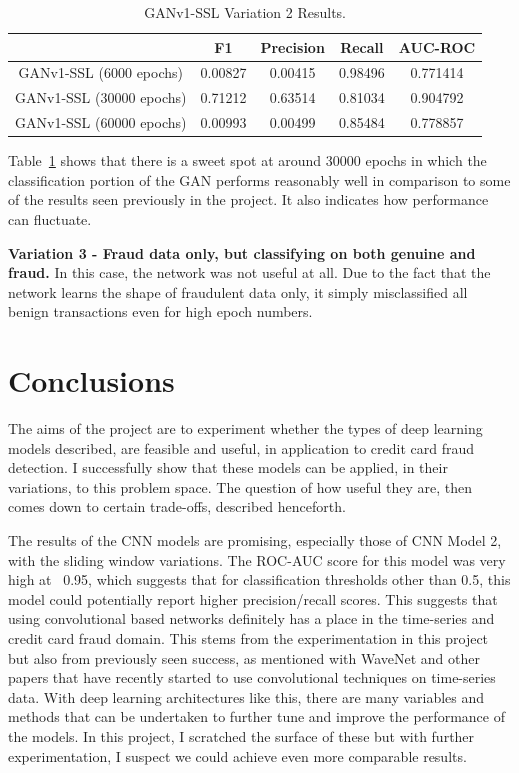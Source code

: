 \documentclass[12pt,a4paper,twoside]{report}
\begin{document}
\begin{table}[H]  
  \centering
  \begin{tabular}{ccccc}
    \toprule
           		& F1 & Precision & Recall & AUC-ROC \\ \midrule
    GANv1-SSL (6000 epochs) & 0.00827  &  0.00415 & 0.98496  & 0.771414 \\
    GANv1-SSL (30000 epochs) & 0.71212  &  0.63514 & 0.81034  & 0.904792 \\
    GANv1-SSL (60000 epochs) & 0.00993   &   0.00499 & 0.85484 & 0.778857  \\
   
   \bottomrule
 \end{tabular}
 \caption{GANv1-SSL Variation 2 Results.}
\label{table:ganv1-ssl-halfhalf}
\end{table}

Table~\ref{table:ganv1-ssl-halfhalf} shows that there is a sweet spot at around 30000 epochs in which the classification portion of the GAN performs reasonably well in comparison to some of the results seen previously in the project. It also indicates how performance can fluctuate. 

\textbf{Variation 3 - Fraud data only, but classifying on both genuine and fraud.}
In this case, the network was not useful at all. Due to the fact that the network learns the shape of fraudulent data only, it simply misclassified all benign transactions even for high epoch numbers. 


\chapter{Conclusions}

The aims of the project are to experiment whether the types of deep learning models described, are feasible and useful, in application to credit card fraud detection. I successfully show that these models can be applied, in their variations, to this problem space. The question of how useful they are, then comes down to certain trade-offs, described henceforth.

The results of the CNN models are promising, especially those of CNN Model 2, with the sliding window variations. The ROC-AUC score for this model was very high at ~0.95, which suggests that for classification thresholds other than 0.5, this model could potentially report higher precision/recall scores. This suggests that using convolutional based networks definitely has a place in the time-series and credit card fraud domain. This stems from the experimentation in this project but also from previously seen success, as mentioned with WaveNet and other papers that have recently started to use convolutional techniques on time-series data. With deep learning architectures like this, there are many variables and methods that can be undertaken to further tune and improve the performance of the models. In this project, I scratched the surface of these but with further experimentation, I suspect we could achieve even more comparable results. 
\end{document}
